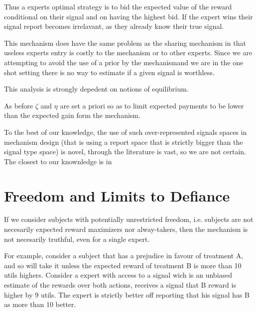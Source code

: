 Thus a experts optimal strategy is to bid the expected value of the reward conditional on their signal and on having the highest bid. If the expert wins their signal report becomes irrelavant, as they already know their true signal. 

This mechanism does have the same problem as the sharing mechanism in that useless experts entry is costly to the mechanism or to other experts. Since we are attempting to avoid the use of a prior by the mechanismand we are in the one shot setting there is no way to estimate if a given signal is worthless. 



This analysis is strongly depedent on notions of equilibrium. 


As before $\zeta$ and $\eta$ are set a priori so as to limit expected payments to be lower than the expected gain form the mechanism. 

To the best of our knowledge, the use of such over-represented signals spaces in mechanism design (that is using a report space that is strictly bigger than the signal type space) is novel, through the literature is vast, so we are not certain. The closest to our knownledge is in 




\section{Freedom and Limits to Defiance}

If we consider subjects with potentially unrestricted freedom, i.e. subjects are not necesarily expected reward maximizers nor alway-takers, then the mechanism is not necesarily truthful, even for a single expert. 

\begin{eg}
	For example, consider a subject that has a prejudice in favour of treatment A, and so will take it unless the expected reward of treatment B is more than 10 utils highers. Consider a expert with access to a signal wich is an unbiased estimate of the rewards over both actions, receives a signal  that B reward is higher by 9 utils. The expert is strictly better off reporting that his signal has B as more than 10 better.
\end{eg}

